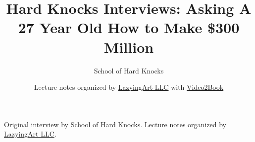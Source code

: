 \documentclass[11pt,oneside]{book}
\begin{document}
\frontmatter
\title{Hard Knocks Interviews: Asking A 27 Year Old How to Make \$300 Million}
\author{School of Hard Knocks}
\date{Lecture notes organized by \href{https://lazying.art}{LazyingArt LLC} with \href{https://github.com/lachlanchen/Video2Book}{Video2Book}}
\maketitle
\begin{center}
\small Original interview by School of Hard Knocks. Lecture notes organized by \href{https://lazying.art}{LazyingArt LLC}.
\end{center}
\clearpage
\mainmatter

\end{document}
